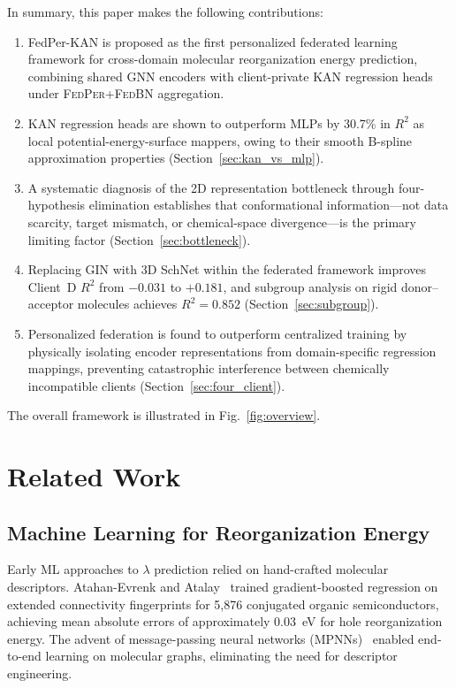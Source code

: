 \documentclass[twocolumn]{article}
\newcommand{\lam}{\lambda}
\newcommand{\Rsq}{R^{2}}
\newcommand{\FedPer}{\textsc{FedPer}}
\newcommand{\FedBN}{\textsc{FedBN}}
\begin{document}
In summary, this paper makes the following contributions:
\begin{enumerate}
\item FedPer-KAN is proposed as the first personalized federated learning framework for cross-domain molecular reorganization energy prediction, combining shared GNN encoders with client-private KAN regression heads under \FedPer{}+\FedBN{} aggregation.
\item KAN regression heads are shown to outperform MLPs by 30.7\% in $\Rsq$ as local potential-energy-surface mappers, owing to their smooth B-spline approximation properties (Section~\ref{sec:kan_vs_mlp}).
\item A systematic diagnosis of the 2D representation bottleneck through four-hypothesis elimination establishes that conformational information---not data scarcity, target mismatch, or chemical-space divergence---is the primary limiting factor (Section~\ref{sec:bottleneck}).
\item Replacing GIN with 3D SchNet within the federated framework improves Client~D $\Rsq$ from $-0.031$ to $+0.181$, and subgroup analysis on rigid donor--acceptor molecules achieves $\Rsq = 0.852$ (Section~\ref{sec:subgroup}).
\item Personalized federation is found to outperform centralized training by physically isolating encoder representations from domain-specific regression mappings, preventing catastrophic interference between chemically incompatible clients (Section~\ref{sec:four_client}).
\end{enumerate}
The overall framework is illustrated in Fig.~\ref{fig:overview}.


\section{Related Work}\label{sec:related}

\subsection{Machine Learning for Reorganization Energy}

Early ML approaches to $\lam$ prediction relied on hand-crafted molecular descriptors.
Atahan-Evrenk and Atalay~\cite{AtahanEvrenk2019_RE} trained gradient-boosted regression on extended connectivity fingerprints for 5{,}876 conjugated organic semiconductors, achieving mean absolute errors of approximately 0.03~eV for hole reorganization energy.
The advent of message-passing neural networks (MPNNs)~\cite{Gilmer2017_MPNN} enabled end-to-end learning on molecular graphs, eliminating the need for descriptor engineering.
\end{document}
